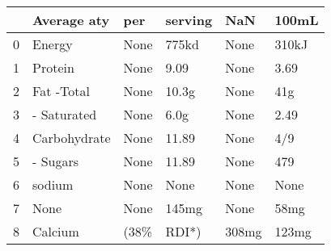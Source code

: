\begin{tabular}{llllll}
\toprule
{} &   Average aty &   per & serving &    NaN &  100mL \\
\midrule
0 &        Energy &  None &   775kd &   None &  310kJ \\
1 &       Protein &  None &    9.09 &   None &   3.69 \\
2 &    Fat -Total &  None &   10.3g &   None &    41g \\
3 &   - Saturated &  None &    6.0g &   None &   2.49 \\
4 &  Carbohydrate &  None &   11.89 &   None &    4/9 \\
5 &      - Sugars &  None &   11.89 &   None &    479 \\
6 &        sodium &  None &    None &   None &   None \\
7 &          None &  None &   145mg &   None &   58mg \\
8 &       Calcium &  (38\% &   RDI*) &  308mg &  123mg \\
\bottomrule
\end{tabular}
